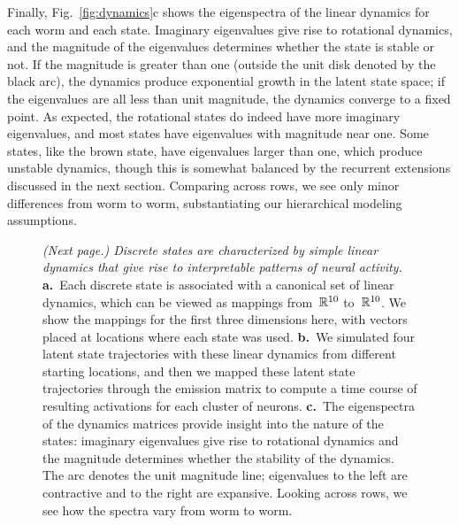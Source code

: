 \documentclass[11pt]{article}
\begin{document}
Finally, Fig.~\ref{fig:dynamics}c shows the eigenspectra of the linear
dynamics for each worm and each state.  Imaginary eigenvalues give
rise to rotational dynamics, and the magnitude of the eigenvalues
determines whether the state is stable or not.  If the magnitude is
greater than one (outside the unit disk denoted by the black arc),
the dynamics produce exponential growth in the latent state space; if
the eigenvalues are all less than unit magnitude, the dynamics converge
to a fixed point.  As expected, the rotational states do indeed have
more imaginary eigenvalues, and most states have eigenvalues with
magnitude near one.  Some states, like the brown state, have eigenvalues
larger than one, which produce unstable dynamics, though this is
somewhat balanced by the recurrent extensions discussed in the next
section.  Comparing across rows, we see only minor differences from worm
to worm, substantiating our hierarchical modeling assumptions.

\begin{figure} [b!]
  \caption{ \textit{(Next page.) Discrete states are characterized by
      simple linear dynamics that give rise to interpretable patterns
      of neural activity.}  \textbf{a.}~Each discrete state is
    associated with a canonical set of linear dynamics, which can be
    viewed as mappings from~$\mathbb{R}^{10}$ to~$\mathbb{R}^{10}$.  We show
    the mappings for the first three dimensions here, with vectors
    placed at locations where each state was used.  \textbf{b.}~We
    simulated four latent state trajectories with these linear
    dynamics from different starting locations, and then we mapped
    these latent state trajectories through the emission matrix to
    compute a time course of resulting activations for each cluster of
    neurons.  \textbf{c.}~The eigenspectra of the dynamics matrices
    provide insight into the nature of the states: imaginary eigenvalues
    give rise to rotational dynamics and the magnitude determines
    whether the stability of the dynamics. The arc denotes
    the unit magnitude line; eigenvalues to the left are contractive
    and to the right are expansive. Looking across rows, we
    see how the spectra vary from worm to worm. }
\end{figure}
\addtocounter{figure}{-1}
\end{document}
